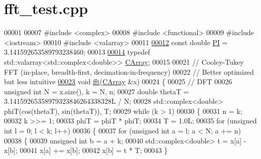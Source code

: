\hypertarget{fft__test_8cpp_source}{\section{fft\+\_\+test.\+cpp}
\label{fft__test_8cpp_source}
}

\begin{DoxyCode}
00001 
00007 \textcolor{preprocessor}{#include <complex>}
00008 \textcolor{preprocessor}{#include <functional>}
00009 \textcolor{preprocessor}{#include <iostream>}
00010 \textcolor{preprocessor}{#include <valarray>}
00011 
\hypertarget{fft__test_8cpp_source_l00012}{}\hyperlink{fft__test_8cpp_a952eac791b596a61bba0a133a3bb439f}{00012} \textcolor{keyword}{const} \textcolor{keywordtype}{double} \hyperlink{fft__test_8cpp_a952eac791b596a61bba0a133a3bb439f}{PI} = 3.141592653589793238460;
00013 
\hypertarget{fft__test_8cpp_source_l00014}{}\hyperlink{fft__test_8cpp_ac43c8a7b2d97f3ccbd6f7a48beaa472c}{00014} \textcolor{keyword}{typedef} std::valarray<std::complex<double>> \hyperlink{fft__test_8cpp_ac43c8a7b2d97f3ccbd6f7a48beaa472c}{CArray};
00015 
00021 \textcolor{comment}{// Cooley-Tukey FFT (in-place, breadth-first, decimation-in-frequency)}
00022 \textcolor{comment}{// Better optimized but less intuitive}
\hypertarget{fft__test_8cpp_source_l00023}{}\hyperlink{fft__test_8cpp_a22051cd252d576aec530227d32d95bdd}{00023} \textcolor{keywordtype}{void} \hyperlink{fft__test_8cpp_a22051cd252d576aec530227d32d95bdd}{fft}(\hyperlink{fft__test_8cpp_ac43c8a7b2d97f3ccbd6f7a48beaa472c}{CArray} &x)
00024 \{
00025     \textcolor{comment}{// DFT}
00026     \textcolor{keywordtype}{unsigned} \textcolor{keywordtype}{int} N = x.size(), k = N, n;
00027     \textcolor{keywordtype}{double} thetaT = 3.14159265358979323846264338328L / N;
00028     std::complex<double> phiT(cos(thetaT), sin(thetaT)), T;
00029     \textcolor{keywordflow}{while} (k > 1)
00030     \{
00031         n = k;
00032         k >>= 1;
00033         phiT = phiT * phiT;
00034         T = 1.0L;
00035         \textcolor{keywordflow}{for} (\textcolor{keywordtype}{unsigned} \textcolor{keywordtype}{int} l = 0; l < k; l++)
00036         \{
00037             \textcolor{keywordflow}{for} (\textcolor{keywordtype}{unsigned} \textcolor{keywordtype}{int} a = l; a < N; a += n)
00038             \{
00039                 \textcolor{keywordtype}{unsigned} \textcolor{keywordtype}{int} b = a + k;
00040                 std::complex<double> t = x[a] - x[b];
00041                 x[a] += x[b];
00042                 x[b] = t * T;
00043             \}

\end{DoxyCode}

